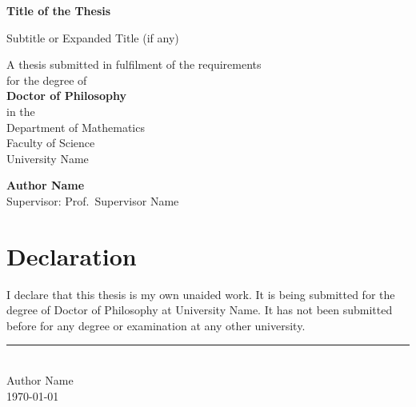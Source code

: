 \documentclass[12pt, a4paper, oneside]{book}
\theoremstyle{plain}
\theoremstyle{definition}
\begin{document}
\frontmatter   %

\begin{titlepage}
    \centering
    \vspace*{2cm}
    {\LARGE\bfseries Title of the Thesis\par}
    \vspace{1.5cm}
    {\Large Subtitle or Expanded Title (if any)\par}
    \vspace{2cm}
    {\large
        A thesis submitted in fulfilment of the requirements\\
        for the degree of\\[0.5em]
        \textbf{Doctor of Philosophy}\\[0.5em]
        in the\\[0.5em]
        Department of Mathematics\\
        Faculty of Science\\
        University Name
    \par}
    \vfill
    {\large
        \textbf{Author Name}\\[0.4em]
        Supervisor: Prof.\ Supervisor Name\\[1em]
        \the\year
    \par}
\end{titlepage}

\chapter*{Declaration}

I declare that this thesis is my own unaided work.  It is being submitted for
the degree of Doctor of Philosophy at University Name.  It has not been
submitted before for any degree or examination at any other university.

\vspace{2cm}
\noindent
\rule{6cm}{0.4pt}\\
Author Name\\
\today

\end{document}
